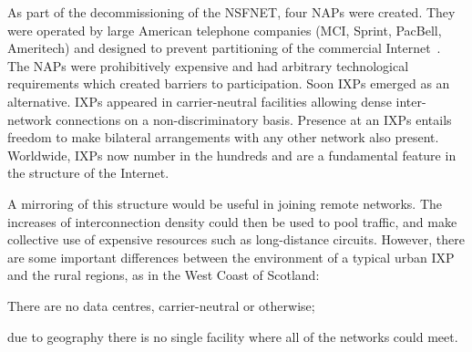 

As part of the decommissioning of the \acs{NSFNET},
four \acp{NAP} were created. They were operated by large
American telephone companies (MCI, Sprint, PacBell, Ameritech) and
designed to prevent partitioning of the commercial
Internet~\cite{Ager:2012,Chatzis:2013}.
The \acp{NAP} were prohibitively expensive and had arbitrary
technological requirements which created barriers to participation.
Soon \acp{IXP} emerged as an alternative. \acp{IXP} appeared in
carrier-neutral facilities allowing dense inter-network connections on
a non-discriminatory basis. Presence at an \acp{IXP} entails freedom
to make bilateral arrangements with any other network also
present. Worldwide, \acp{IXP} now number in the hundreds and are a
fundamental feature in the structure of the Internet.



A mirroring of this structure would be useful in joining remote
networks. The increases of interconnection density could then
be used to pool traffic, and make collective use of expensive resources
such as long-distance circuits. However, there are some important
differences between the environment of a typical urban \ac{IXP} and
the rural regions, as in the West Coast of Scotland:
\begin{inparaenum}[(i)]
  \item There are no data centres, carrier-neutral or otherwise;
  \item due to geography there is no single facility where all of the
    networks could meet.
\end{inparaenum}
